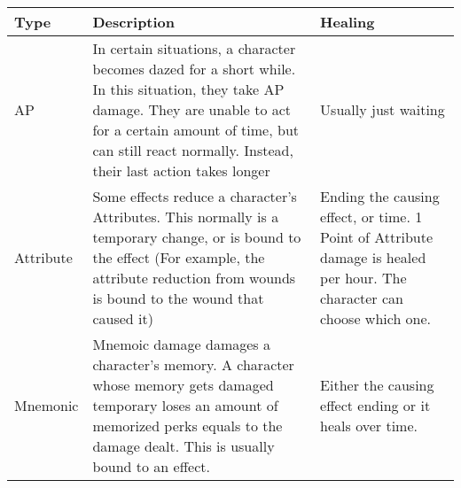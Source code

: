 \begin{longtable}{l p{5cm} p{5cm}}
Type & Description & Healing \\ \hline
AP & In certain situations, a character becomes dazed for a short while. In this situation, they take AP damage. They are unable to act for a certain amount of time, but can still react normally. Instead, their last action takes longer & Usually just waiting\\
Attribute & Some effects reduce a character's Attributes. This normally is a temporary change, or is bound to the effect (For example, the attribute reduction from wounds is bound to the wound that caused it) & Ending the causing effect, or time. 1 Point of Attribute damage is healed per hour. The character can choose which one.\\
Mnemonic & Mnemoic damage damages a character's memory. A character whose memory gets damaged temporary loses an amount of memorized perks equals to the damage dealt. This is usually bound to an effect. & Either the causing effect ending or it heals over time.\\
\end{longtable}
